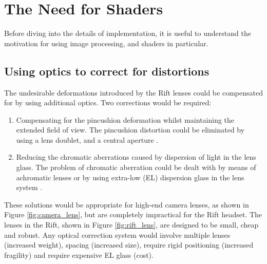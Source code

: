 \documentclass[MSc,paper=a4,pagesize=auto]{icldt}
\begin{document}
\clearpage
\section{The Need for Shaders}
\label{sec:need_for_shaders}
Before diving into the details of implementation, it is useful to understand the motivation for using image processing, and shaders in particular. 

\subsection{Using optics to correct for distortions}
The undesirable deformations introduced by the Rift lenses could be compensated for by using additional optics. Two corrections would be required: 
\begin{enumerate}
\item Compensating for the pincushion deformation whilst maintaining the extended field of view. The pincushion distortion could be eliminated by using a lens doublet, and a central aperture \cite{Brainerd2004}.
\item Reducing the chromatic aberrations caused by dispersion of light in the lens glass. The problem of chromatic aberration could be dealt with by means of achromatic lenses or by using extra-low (EL) dispersion glass in the lens system \cite{Davis2014}.
\end{enumerate}

These solutions would be appropriate for high-end camera lenses, as shown in Figure \ref{fig:camera_lens}, but are completely impractical for the Rift headset. The lenses in the Rift, shown in Figure \ref{fig:rift_lens}, are designed to be small, cheap and robust. Any optical correction system would involve multiple lenses (increased weight), spacing (increased size), require rigid positioning (increased fragility) and require expensive EL glass (cost).
\end{document}

